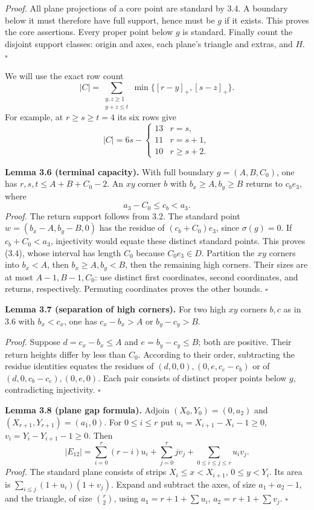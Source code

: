 \documentclass[11pt]{article}
\begin{document}
\emph{Proof.}
All plane projections of a core point are standard by 3.4. A boundary
below it must therefore have full support, hence must be $g$ if it
exists. This proves the core assertions. Every proper point below $g$
is standard. Finally count the disjoint support classes: origin and
axes, each plane's triangle and extras, and $H$. \ensuremath{\square}

We will use the exact row count
\[
 |C|=\sum_{\substack{y,z\ge1\\y+z\le t}}
 \min\{[r-y]_+,[s-z]_+\}.\tag{3.2}
\]
For example, at $r\ge s\ge t=4$ its six rows give
\[
 |C|=6s-\begin{cases}13&r=s,\\11&r=s+1,\\10&r\ge s+2.\end{cases}\tag{3.3}
\]

\label{res:A.5}
\textbf{Lemma 3.6 (terminal capacity).}
With full boundary $g=(A,B,C_0)$, one has $r,s,t\le A+B+C_0-2$.
An $xy$ corner $b$ with $b_x\ge A,b_y\ge B$ returns to $c_be_3$, where
\[
 a_3-C_0\le c_b<a_3.\tag{3.4}
\]
\emph{Proof.}
The return support follows from 3.2. The standard point
$w=(b_x-A,b_y-B,0)$ has the residue of $(c_b+C_0)e_3$, since
$\sigma(g)=0$. If $c_b+C_0<a_3$, injectivity would equate these
distinct standard points. This proves (3.4), whose interval has length
$C_0$ because $C_0e_3\in D$.
Partition the $xy$ corners into $b_x<A$, then $b_x\ge A,b_y<B$,
then the remaining high corners. Their sizes are at most $A-1,B-1,C_0$:
use distinct first coordinates, second coordinates, and returns,
respectively. Permuting coordinates proves the other bounds.
\ensuremath{\square}

\label{res:A.6}
\textbf{Lemma 3.7 (separation of high corners).}
For two high $xy$ corners $b,c$ as in 3.6 with $b_x<c_x$,
one has $c_x-b_x>A$ or $b_y-c_y>B$.

\emph{Proof.}
Suppose $d=c_x-b_x\le A$ and $e=b_y-c_y\le B$; both are positive.
Their return heights differ by less than $C_0$. According to their
order, subtracting the residue identities equates the residues of
$(d,0,0),(0,e,c_c-c_b)$ or of $(d,0,c_b-c_c),(0,e,0)$.
Each pair consists of distinct proper points below $g$, contradicting
injectivity. \ensuremath{\square}

\label{res:A.7}
\textbf{Lemma 3.8 (plane gap formula).}
Adjoin $(X_0,Y_0)=(0,a_2)$ and $(X_{r+1},Y_{r+1})=(a_1,0)$.
For $0\le i\le r$ put
$u_i=X_{i+1}-X_i-1\ge0$, $v_i=Y_i-Y_{i+1}-1\ge0$. Then
\[
 |E_{12}|=\sum_{i=0}^r(r-i)u_i+\sum_{j=0}^r jv_j
             +\sum_{0\le i\le j\le r}u_iv_j.\tag{3.5}
\]
\emph{Proof.}
The standard plane consists of strips $X_i\le x<X_{i+1}$,
$0\le y<Y_i$. Its area is
$\sum_{i\le j}(1+u_i)(1+v_j)$.
Expand and subtract the axes, of size $a_1+a_2-1$, and the triangle,
of size $\binom r2$, using
$a_1=r+1+\sum u_i$, $a_2=r+1+\sum v_j$. \ensuremath{\square}
\end{document}
